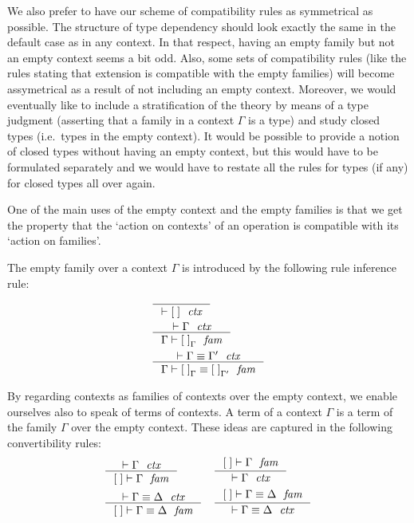 We also prefer to have our scheme of compatibility rules as symmetrical as
possible. The structure of type dependency should look exactly the same in the
default case as in any context. In that respect, having an empty family but not
an empty context seems a bit odd. Also, some sets of compatibility rules 
(like the rules stating that extension is compatible with the empty families)
will become assymetrical as a result of not including an empty context. Moreover,
we would eventually like to include a stratification of the theory by means of
a type judgment (asserting that a family in a context $\Gamma$ is a type) and
study closed types (i.e.~types in the empty context). It would be possible to
provide a notion of closed types without having an empty context, but this would
have to be formulated separately and we would have to restate all the rules for
types (if any) for closed types all over again.

One of the main uses of the empty context and the empty families is that we
get the property that the `action on contexts' of an operation is compatible
with its `action on families'.

The empty family over a context $\Gamma$ is introduced by the following rule
inference rule:
\begin{align}
& \inference
  { }
  { \jctx{\emptyc}
    }
  \\
& \inference
  { \jctx{\Gamma}
    }
  { \jfam{\Gamma}{\emptyf[\Gamma]}
    }
  \\
& \inference
  { \jctxeq{\Gamma}{\Gamma'}
    }
  { \jfameq{\Gamma}{\emptyf[\Gamma]}{\emptyf[\Gamma']}
    }
\end{align}

By regarding contexts as families of contexts over the empty context, we
enable ourselves also to speak of terms of contexts. A term of a context
$\Gamma$ is a term of the family $\Gamma$ over the empty context. These ideas
are captured in the following convertibility rules:
\begin{align}
& \inference
  { \jctx{\Gamma}
    }
  { \jfam{\emptyc}{\Gamma}
    } 
& & \inference
    { \jfam{\emptyc}{\Gamma}
      }
    { \jctx{\Gamma}
      }
    \\
& \inference
  { \jctxeq{\Gamma}{\Delta}
    }
  { \jfameq{\emptyc}{\Gamma}{\Delta}
    }
& & \inference
    { \jfameq{\emptyc}{\Gamma}{\Delta}
      }
    { \jctxeq{\Gamma}{\Delta}
      }
\end{align}

